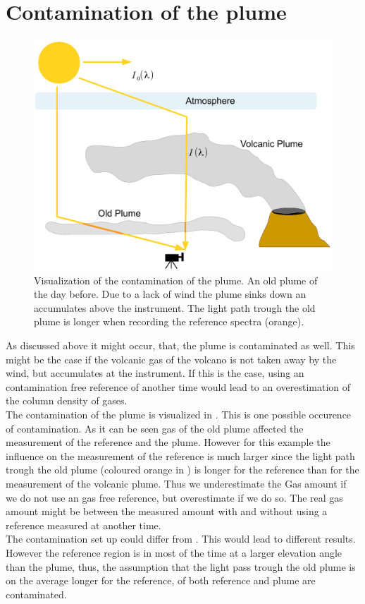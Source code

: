 \documentclass  [
  paper    = a4,
  BCOR     = 10mm,
  twoside,
  fontsize = 12pt,
  fleqn,
  toc      = bibnumbered,
  toc      = listofnumbered,
  numbers  = noendperiod,
  headings = normal,
  listof   = leveldown,
  version  = 3.03
]                                       {scrreprt}
\begin{document}
	\section{Contamination of the plume}
	\begin{figure}
		\centering
		\includegraphics[width=0.7\linewidth]{Bilder/Contaminationplume}
		\caption{Visualization of the contamination of the plume. An old plume of the day before. Due to a lack of wind the plume sinks down an accumulates above the instrument. The light path trough the old plume is longer when recording the reference spectra (orange).}
		\label{fig:contaminationplume}
	\end{figure}
	 As discussed above it might occur, that, the plume is contaminated as well. This might be the case if the volcanic gas of the volcano is not taken away by the wind, but accumulates at the instrument. If this is the case, using an contamination free reference of another time would lead to an overestimation of the column density of gases.\\
	 The contamination of the plume is visualized in . This is one possible occurence of contamination. As it can be seen gas of the old plume affected the measurement of the reference and the plume. However for this example the influence on the measurement of the reference is much larger since the light path trough the old plume (coloured orange in ) is longer for the reference than for the measurement of the volcanic plume. Thus we underestimate the Gas amount if we do not use an gas free reference, but overestimate if we do so.
	 The real gas amount might be between the measured amount with and without using a reference measured at another time.\\
	 The contamination set up could differ from . This would lead to different results. However the reference region is in most of the time at a larger elevation angle than the plume, thus, the assumption that the light pass trough the old plume is on the average longer for the reference, of both reference and plume are contaminated.
	 
\end{document}
